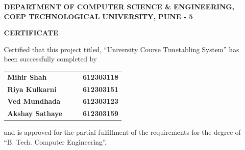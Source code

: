 \thispagestyle{empty}
{
\linespread{2}\selectfont
\begin{center}
	\large{\bf{DEPARTMENT OF COMPUTER SCIENCE \& ENGINEERING,\\
	      COEP TECHNOLOGICAL UNIVERSITY, PUNE - 5\\}}
\end{center}

\vspace{20pt}

\begin{center}
	\Large{\bf{CERTIFICATE\\}}
\end{center}

\vspace{20pt}
}

\linespread{1.5}\selectfont
\large{
Certified that this project titled, ``University Course Timetabling System''
has been successfully completed by \\
\begin{center}
	\begin{tabular}{ l c c l }
	\Large\bf{Mihir Shah}      & & & \Large\bf{612303118} \\ [0.3cm]
	\Large\bf{Riya Kulkarni}   & & & \Large\bf{612303151} \\ [0.3cm]
	\Large\bf{Ved Mundhada}    & & & \Large\bf{612303123} \\ [0.3cm]
	\Large\bf{Akshay Sathaye}  & & & \Large\bf{612303159} \\
	\end{tabular}
\end{center}
and is approved for the partial fulfillment of the requirements for the degree of
``B. Tech. Computer Engineering''.
}

